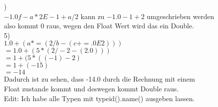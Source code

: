 \documentclass[12pt]{article}
\begin{document}
)\\[4pt]
\hspace*{3mm}$-1.0f - a*2E-1 + a/2 $ kann zu $-1.0 - 1 + 2$ umgeschrieben werden\\
\hspace*{3mm}also kommt 0 raus, wegen den Float Wert wird das ein Double.\\[4pt]
5)\\ [4pt]
\hspace*{3mm}$1.0 + (a *= ( 2/b - (c += .0E2)))$\\
\hspace*{3mm}$= 1.0 +( 5 * ( 2/-2 - (2.0)))$ \\
\hspace*{3mm}$= 1 + (5 * ((-1) - 2 )$ \\ 
\hspace*{3mm}$= 1 + (-15)$ \\ 
\hspace*{3mm}$ = -14$  \\
\hspace*{3mm}Dadurch ist zu sehen, dass -14.0 durch die Rechnung mit einem\\
\hspace*{3mm}Float zustande kommt und deswegen kommt Double raus.  \\[40 pt]
Edit: Ich habe alle Typen mit typeid().name() ausgeben lassen. 
\end{document}

